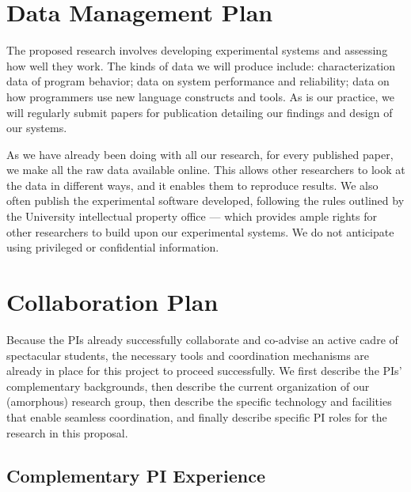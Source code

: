 \newpage

\section*{Data Management Plan}

The proposed research involves developing experimental systems and
assessing how well they work. The kinds of data we will produce
include: characterization data of program behavior; data on system
performance and reliability; data on how programmers use new language
constructs and tools. As is our practice, we will regularly submit
papers for publication detailing our findings and design of our
systems.

As we have already been doing with all our research, for every
published paper, we make all the raw data available online. This
allows other researchers to look at the data in different ways, and it
enables them to reproduce results. We also often publish
the experimental software developed, following the rules outlined by
the University intellectual property office --- which provides ample
rights for other researchers to build upon our experimental
systems. We do not anticipate using privileged or confidential
information. 

\newpage
\section*{Collaboration Plan}

Because the PIs already successfully collaborate and co-advise an
active cadre of spectacular students, the necessary tools and
coordination mechanisms are already in place for this project to
proceed successfully.  We first describe the PIs' complementary
backgrounds, then describe the current organization of our (amorphous)
research group, then describe the specific technology and facilities
that enable seamless coordination, and finally describe specific PI roles
for the research in this proposal.

\subsection*{Complementary PI Experience}

